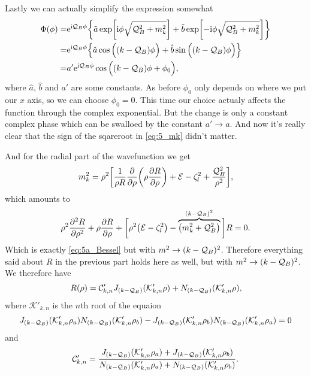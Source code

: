 \documentclass[11pt,letter, swedish, english
]{article}
\begin{document}
Lastly we can actually simplify the expression somewhat
\begin{equation}
\begin{aligned}
\Phi(\phi)=&\mathrm{e}^{\mathrm{i}\mathcal{Q}_B\phi}\qty{
\tilde{a}\exp[\mathrm{i}\phi\sqrt{\ensuremath{\mathcal{Q}_B}^2+m_k^2}]
+\tilde{b}\exp[-\mathrm{i}\phi\sqrt{\ensuremath{\mathcal{Q}_B}^2+m_k^2}]}\\
=&\mathrm{e}^{\mathrm{i}\mathcal{Q}_B\phi}\qty{
\hat{a}\cos\Big((k-\ensuremath{\mathcal{Q}_B})\phi\Big)
+\hat{b}\sin\Big((k-\ensuremath{\mathcal{Q}_B})\phi\Big)}\\
=&a'\mathrm{e}^{\mathrm{i}\mathcal{Q}_B\phi}
\cos\Big((k-\mathcal{Q}_B)\phi+\phi_0\Big),
\end{aligned}
\end{equation}
where $\hat{a}$, $\hat{b}$ and $a'$ are some constants. As before
$\phi_0$ only depends on where we put our $x$ axis, so we can choose
$\phi_0=0$. This time our choice actualy affects the function through
the complex exponential. But the change is only a constant complex
phase which can be swalloed by the constant $a'\to a$. And now it's
really clear that the sign of the sqareroot in \eqref{eq:5_mk} didn't
matter. 

And for the radial part of the wavefunction we get
\begin{equation}
m^2_k=\rho^2\qty[\frac{1}{\rho R}\pdv{\rho}
\qty(\rho\pdv{R}{\rho})+\mathcal{E}-\zeta_l^2+\frac{\mathcal{Q}_B^2}{\rho^2}],
\end{equation}
which amounts to
\vspace{-4mm}\begin{equation}
\rho^2\pdv[2]{R}{\rho}
+\rho\pdv{R}{\rho}+\bigg[\rho^2\qty(\mathcal{E}-\zeta_l^2)
-\overbrace{\qty(m_k^2+\mathcal{Q}_B^2)}^{(k-\mathcal{Q}_B)^2}\bigg]R=0.
\end{equation}
Which is exactly \eqref{eq:5a_Bessel} but with
$m^2\to(k-\mathcal{Q}_B)^2$. Therefore everything said about $R$ in the
previous part holds here as well, but with $m^2\to(k-\mathcal{Q}_B)^2$.
We therefore have
\begin{equation}
R(\rho)=\mathcal{C}'_{k, n}
J_{(k-\mathcal{Q}_B)}(\mathcal{K}'_{k,n}\rho)
+N_{(k-\mathcal{Q}_B)}(\mathcal{K}'_{k,n}\rho),
\end{equation}
where $\mathcal{K}'_{k,n}$ is the $n$th root of the equaion
\begin{equation}\label{eq:5b_K}
J_{(k-\mathcal{Q}_B)}(\mathcal{K}'_{k,n}\rho_a)N_{(k-\mathcal{Q}_B)}(\mathcal{K}'_{k,n}\rho_b)
-J_{(k-\mathcal{Q}_B)}(\mathcal{K}'_{k,n}\rho_b)N_{(k-\mathcal{Q}_B)}(\mathcal{K}'_{k,n}\rho_a)=0
\end{equation}
and
\begin{equation}\label{eq:5b_C}
\mathcal{C}'_{k,n}=
\frac{J_{(k-\mathcal{Q}_B)}(\mathcal{K}'_{k,n}\rho_a)+J_{(k-\mathcal{Q}_B)}(\mathcal{K}'_{k,n}\rho_b)}
{N_{(k-\mathcal{Q}_B)}(\mathcal{K}'_{k,n}\rho_a)+N_{(k-\mathcal{Q}_B)}(\mathcal{K}'_{k,n}\rho_b)}.
\end{equation}
\end{document}

